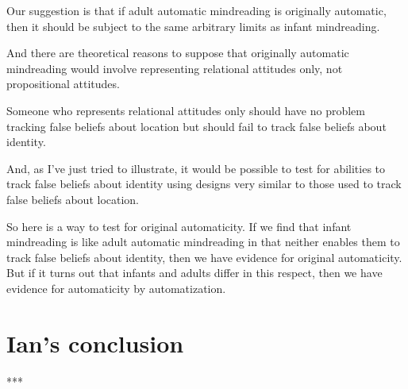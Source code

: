\documentclass[14pt,\papersize]{extarticle}
\begin{document}
Our suggestion is that if adult automatic mindreading is originally automatic, then it should be subject to the same arbitrary limits as infant mindreading.

And there are theoretical reasons to suppose that originally automatic mindreading would involve representing relational attitudes only, not propositional attitudes.

Someone who represents relational attitudes only
should have no problem tracking false beliefs about location
but should fail to track false beliefs about identity.

And, as I've just tried to illustrate, it would be possible to test for abilities to track false beliefs about identity using designs very similar to those used to track false beliefs about location.

So here is a way to test for original automaticity.
If we find that infant mindreading is like adult automatic mindreading in that neither enables them to track  false beliefs about identity,
then we have evidence for original automaticity.
But if it turns out that infants and adults differ in this respect,
then we have evidence for automaticity by automatization.


\section{Ian's conclusion}
***


\end{document}
